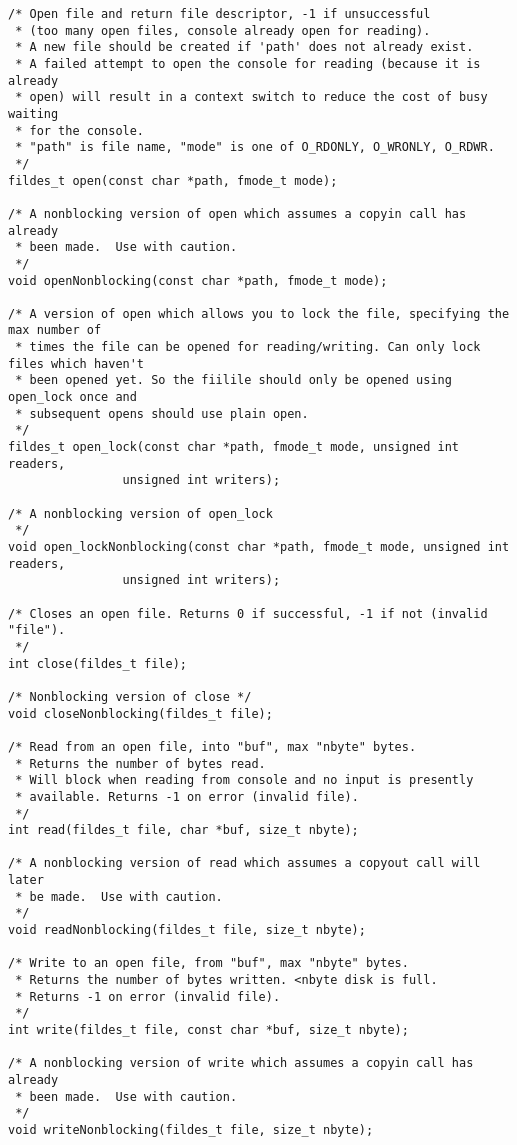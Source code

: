 \documentclass[12pt,english]{article}
\begin{document}
\begin{verbatim}
/* Open file and return file descriptor, -1 if unsuccessful 
 * (too many open files, console already open for reading).
 * A new file should be created if 'path' does not already exist.
 * A failed attempt to open the console for reading (because it is already
 * open) will result in a context switch to reduce the cost of busy waiting
 * for the console.
 * "path" is file name, "mode" is one of O_RDONLY, O_WRONLY, O_RDWR.
 */
fildes_t open(const char *path, fmode_t mode);

/* A nonblocking version of open which assumes a copyin call has already
 * been made.  Use with caution.
 */
void openNonblocking(const char *path, fmode_t mode);

/* A version of open which allows you to lock the file, specifying the max number of
 * times the file can be opened for reading/writing. Can only lock files which haven't
 * been opened yet. So the fiilile should only be opened using open_lock once and
 * subsequent opens should use plain open.
 */
fildes_t open_lock(const char *path, fmode_t mode, unsigned int readers,
                unsigned int writers);

/* A nonblocking version of open_lock
 */
void open_lockNonblocking(const char *path, fmode_t mode, unsigned int readers,
                unsigned int writers);

/* Closes an open file. Returns 0 if successful, -1 if not (invalid "file").
 */
int close(fildes_t file);

/* Nonblocking version of close */
void closeNonblocking(fildes_t file);

/* Read from an open file, into "buf", max "nbyte" bytes.
 * Returns the number of bytes read.
 * Will block when reading from console and no input is presently
 * available. Returns -1 on error (invalid file).
 */
int read(fildes_t file, char *buf, size_t nbyte);

/* A nonblocking version of read which assumes a copyout call will later
 * be made.  Use with caution.
 */
void readNonblocking(fildes_t file, size_t nbyte);

/* Write to an open file, from "buf", max "nbyte" bytes.
 * Returns the number of bytes written. <nbyte disk is full.
 * Returns -1 on error (invalid file).
 */
int write(fildes_t file, const char *buf, size_t nbyte);

/* A nonblocking version of write which assumes a copyin call has already
 * been made.  Use with caution.
 */
void writeNonblocking(fildes_t file, size_t nbyte);


\end{verbatim}
\end{document}
